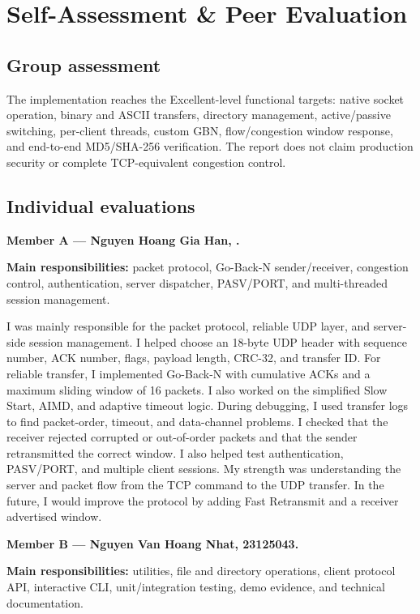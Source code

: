 \section{Self-Assessment \& Peer Evaluation}

\subsection{Group assessment}

The implementation reaches the Excellent-level functional targets: native
socket operation, binary and ASCII transfers, directory management,
active/passive switching, per-client threads, custom GBN, flow/congestion
window response, and end-to-end MD5/SHA-256 verification. The report does not
claim production security or complete TCP-equivalent congestion control.

\subsection{Individual evaluations}

\textbf{Member A --- Nguyen Hoang Gia Han, .}

\textbf{Main responsibilities:} packet protocol, Go-Back-N sender/receiver,
congestion control, authentication, server dispatcher, PASV/PORT, and
multi-threaded session management.

I was mainly responsible for the packet protocol, reliable UDP layer, and
server-side session management. I helped choose an 18-byte UDP header with
sequence number, ACK number, flags, payload length, CRC-32, and transfer ID.
For reliable transfer, I implemented Go-Back-N with cumulative ACKs and a
maximum sliding window of 16 packets. I also worked on the simplified Slow
Start, AIMD, and adaptive timeout logic. During debugging, I used transfer
logs to find packet-order, timeout, and data-channel problems. I checked that
the receiver rejected corrupted or out-of-order packets and that the sender
retransmitted the correct window. I also helped test authentication,
PASV/PORT, and multiple client sessions. My strength was understanding the
server and packet flow from the TCP command to the UDP transfer. In the
future, I would improve the protocol by adding Fast Retransmit and a receiver
advertised window.

\textbf{Member B --- Nguyen Van Hoang Nhat, 23125043.}

\textbf{Main responsibilities:} utilities, file and directory operations,
client protocol API, interactive CLI, unit/integration testing, demo evidence,
and technical documentation.

